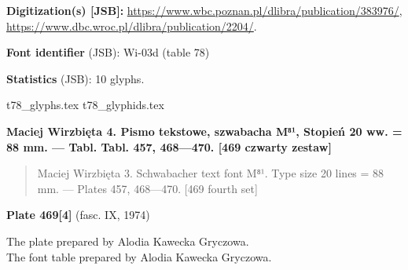 \documentclass[12pt]{article}
\newcommand{\bg}{\begingl}
\newcommand{\pismoPL}[1]{{\relsize{2}\Junicode\textbf{#1}}}
\newcommand{\pismoEN}[1]{{\relsize{1}\Junicode\begin{quote}#1\end{quote}}}
\newcommand{\plate}[3]{\textbf{Plate #1} (fasc. #2, #3)}
\newcommand{\exampleBib}[1]{{\relsize{2}\Junicode\textbf{The
      example:}\\[2ex] CATALOGUS LIBRORUM \textbf{#1}}}
\newcommand{\exampleDesc}[1]{{\relsize{0}\Junicode#1}}
\newcommand{\exampleDig}[1]{{\relsize{0}\Junicode \textbf{Digitization(s) [JSB]:} #1}}
\newcommand{\exampleLib}[1]{{\relsize{0}\Junicode \textbf{Library:} #1}}
\newcommand{\fontID}[2]{{\relsize{1}\Junicode\textbf{Font identifier} (JSB): #1 (table #2)}}
\newcommand{\fontstat}[1]{{\relsize{1}\Junicode\textbf{Statistics} (JSB): #1 glyphs.}}
\newcommand{\exampleRef}[1]{{\relsize{0}\Junicode \textbf{References:} #1}}
\newcommand{\examplePage}[1]{{Page reference: \relsize{0}\Junicode#1}}
\begin{document}

  




  \exampleDig{\url{https://www.wbc.poznan.pl/dlibra/publication/383976/},
    \url{https://www.dbc.wroc.pl/dlibra/publication/2204/}}.

\bigskip

\fontID{Wi-03d}{78}

\fontstat{10}

  {t78_glyphs.tex}
  {t78_glyphids.tex}

 \newpage
 
% 

 


 \pismoPL{Maciej Wirzbięta 4. Pismo tekstowe, szwabacha M⁸¹, Stopień
   20 ww. = 88 mm. — Tabl. Tabl. 457, 468—470. [469 czwarty zestaw]}
  
 \pismoEN{Maciej Wirzbięta 3. Schwabacher text font M⁸¹.
Type size 20 lines =  88 mm. — Plates 457, 468—470. [469 fourth set]}

\plate{469[4]}{IX}{1974}

The plate prepared by Alodia Kawecka Gryczowa.\\
The font table prepared by Alodia Kawecka Gryczowa.
\end{document}
